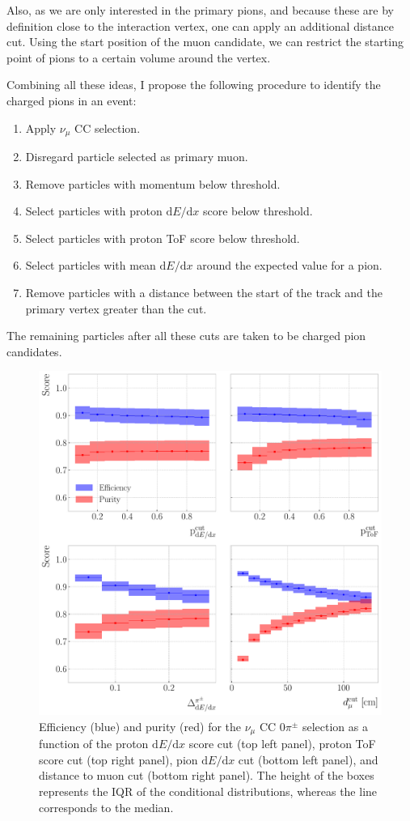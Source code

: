 Also, as we are only interested in the primary pions, and because these are by definition close to the interaction vertex, one can apply an additional distance cut. Using the start position of the muon candidate, we can restrict the starting point of pions to a certain volume around the vertex.

Combining all these ideas, I propose the following procedure to identify the charged pions in an event:
\begin{enumerate}
    \item Apply $\nu_{\mu}$ CC selection.
    \item Disregard particle selected as primary muon.
    \item Remove particles with momentum below threshold.
    \item Select particles with proton $\mathrm{d}E/\mathrm{d}x$ score below threshold.
    \item Select particles with proton ToF score below threshold.
    \item Select particles with mean $\mathrm{d}E/\mathrm{d}x$ around the expected value for a pion.
    \item Remove particles with a distance between the start of the track and the primary vertex greater than the cut.
\end{enumerate}
The remaining particles after all these cuts are taken to be charged pion candidates.

\begin{figure}[t]
    \centering
    \includegraphics[width=.85\linewidth]{Images/GAr_selection/pion_selection_0_pions_metrics.pdf}
    \caption[Efficiency and purity for the $\nu_{\mu}$ CC $0\pi^{\pm}$ selection as a function of the different cuts.]{Efficiency (blue) and purity (red) for the $\nu_{\mu}$ CC $0\pi^{\pm}$ selection as a function of the proton $\mathrm{d}E/\mathrm{d}x$ score cut (top left panel), proton ToF score cut (top right panel), pion $\mathrm{d}E/\mathrm{d}x$ cut (bottom left panel), and distance to muon cut (bottom right panel). The height of the boxes represents the IQR of the conditional distributions, whereas the line corresponds to the median.}
    \label{fig:pion_selection_0_pions_metrics}
\end{figure}

